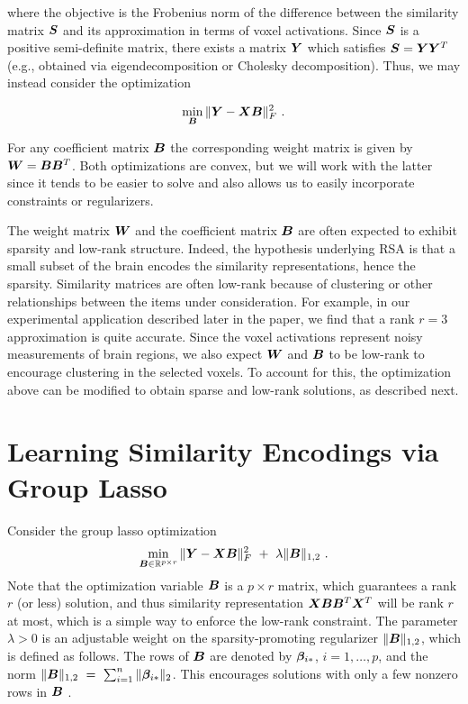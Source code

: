 where the objective is the Frobenius norm of the difference between the similarity matrix
$\boldsymbol{S}$ and its approximation in terms of voxel activations. Since $\boldsymbol{S}$ is a positive
semi-definite matrix, there exists a matrix $\boldsymbol{Y}$ which satisfies $\boldsymbol{S}=\boldsymbol{Y}\boldsymbol{Y}^T$ (e.g.,
obtained via eigendecomposition or Cholesky decomposition).  Thus, we may instead consider
the optimization

$$\min_{\bB} \|\bY-\bX\bB\|_F^2 \ . $$

For any coefficient matrix $\boldsymbol{B}$ the corresponding weight matrix is given by $\boldsymbol{W} =
\boldsymbol{B}\boldsymbol{B}^T$. Both optimizations are convex, but we will work with the latter since it tends
to be easier to solve and also allows us to easily incorporate constraints or
regularizers.

The weight matrix $\boldsymbol{W}$ and the coefficient matrix $\boldsymbol{B}$ are often expected to exhibit
sparsity and low-rank structure. Indeed, the hypothesis underlying RSA is that a small
subset of the brain encodes the similarity representations, hence the sparsity.
Similarity matrices are often low-rank because of clustering or other relationships
between the items under consideration. For example, in our experimental application
described later in the paper, we find that a rank $r=3$ approximation is quite accurate.
Since the voxel activations represent noisy measurements of brain regions, we also expect
$\boldsymbol{W}$ and $\boldsymbol{B}$ to be low-rank to encourage clustering in the selected voxels.  To account
for this, the optimization above can be modified to obtain sparse and low-rank solutions,
as described next.



\section{Learning Similarity Encodings via Group Lasso}

Consider the group lasso optimization
\begin{equation}\label{eqn.grouplasso}
 \min_{\bB\in \R^{p\times r}} \|\bY-\bX\bB\|_F^2 \ + \ \lambda \|\bB\|_{1,2}  \ .
 \end{equation}
Note that the optimization variable $\boldsymbol{B}$ is a $p\times r$ matrix, which guarantees a rank
$r$ (or less) solution, and thus similarity representation $\boldsymbol{X}\boldsymbol{B}\boldsymbol{B}^T\boldsymbol{X}^T$ will be rank
$r$ at most, which is a simple way to enforce the low-rank constraint.  The parameter
$\lambda>0$ is an adjustable weight on the sparsity-promoting regularizer
$\|\boldsymbol{B}\|_{1,2}$, which is defined as follows. The rows of $\boldsymbol{B}$ are denoted by
$\boldsymbol{\beta}_{i{\ast}}$, $i=1,\dots,p$, and the norm
$\|\boldsymbol{B}\|_{1,2} \ = \ \sum_{i=1}^n \|\boldsymbol{\beta}_{i{\ast}}\|_2$. This encourages solutions with only
a few nonzero rows in $\boldsymbol{B}$ \cite{obo11,lounici,vandegeer}.

